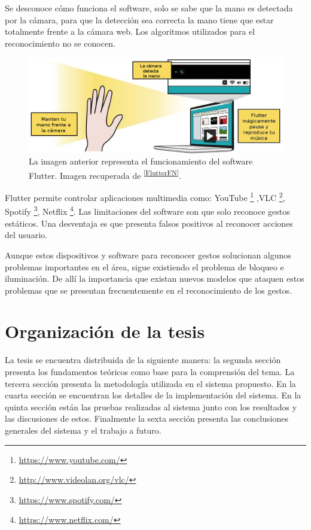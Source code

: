 Se desconoce cómo funciona el software, solo se sabe que la mano es detectada por la cámara, para que la detección sea correcta la mano tiene que estar totalmente frente a la cámara web. Los algoritmos utilizados para el reconocimiento no se conocen.  
\begin{figure}[h!]
\begin{center}
\includegraphics[scale=.4]{./Figures/Flutter.jpg}
\end{center}
\caption{La imagen anterior representa el funcionamiento del software Flutter. Imagen recuperada de \textsuperscript{\ref{FlutterFN}}.}
\label{fig:Flutter}
\end{figure}

Flutter permite controlar aplicaciones multimedia como: YouTube \footnote{\url{https://www.youtube.com/}} ,VLC \footnote{\url{http://www.videolan.org/vlc/}}, Spotify \footnote{\url{https://www.spotify.com/}}, Netflix \footnote{\url{https://www.netflix.com/}}. Las limitaciones del software son que solo reconoce gestos estáticos. Una desventaja es que presenta falsos positivos al reconocer acciones del usuario.  


Aunque estos dispositivos y software para reconocer gestos solucionan algunos problemas importantes en el área, sigue existiendo el problema de bloqueo e iluminación.
De allí la importancia que existan nuevos modelos que ataquen estos problemas que se presentan frecuentemente en el reconocimiento de los gestos.
  
\section{Organizaci\'on de la tesis}\label{OrganizacionTesis}

La tesis se encuentra distribuida de la siguiente manera: la segunda sección presenta los fundamentos teóricos como base para la comprensión del tema. La tercera sección presenta la metodología utilizada en el sistema propuesto. En la cuarta sección se encuentran los detalles de la implementación del sistema. En la quinta sección están las pruebas realizadas al sistema junto con los resultados y las discusiones de estos. Finalmente la sexta sección presenta las conclusiones generales del sistema y el trabajo a futuro. 

